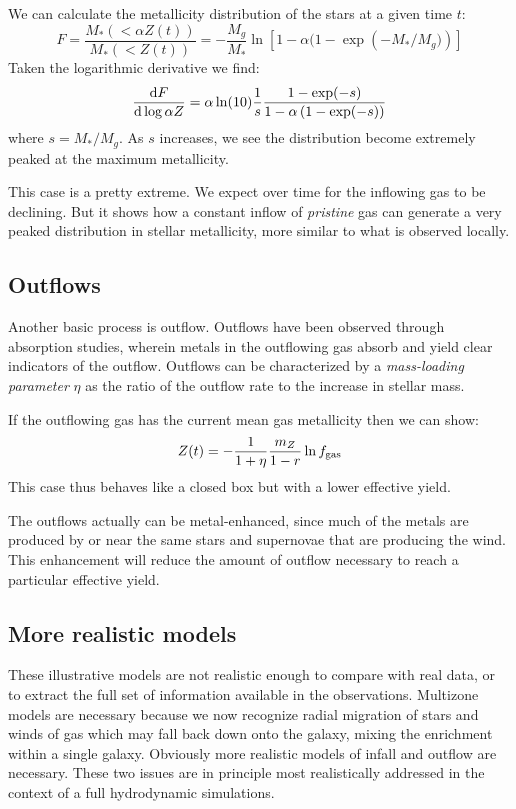 We can calculate the metallicity distribution of the stars at a given
time $t$:
\begin{equation}
  F=  \frac{M_\ast(<\alpha Z(t))}{M_\ast(<Z(t))}
  = -\frac{M_g}{M_\ast} \ln\left[1- \alpha (1- \exp\left(-M_\ast /
    M_g)\right) \right]
\end{equation}
Taken the logarithmic derivative we find:
\begin{equation}
  \frac{{\rm d}F}{{\rm d} \log\alpha Z}
  = \alpha \ln(10) \frac{1}{s} \frac{1-\exp(-s)}{1-
      \alpha\left(1-\exp(-s)\right) }
\end{equation}
where $s = M_\ast/M_g$. As $s$ increases, we see the distribution
become extremely peaked at the maximum metallicity.

This case is a pretty extreme. We expect over time for the inflowing
gas to be declining.  But it shows how a constant inflow of {\it
pristine} gas can generate a very peaked distribution in stellar
metallicity, more similar to what is observed locally.

\subsection{Outflows}

Another basic process is outflow. Outflows have been observed through
absorption studies, wherein metals in the outflowing gas absorb and
yield clear indicators of the outflow. Outflows can be characterized
by a {\it mass-loading parameter} $\eta$ as the ratio of the outflow
rate to the increase in stellar mass.

If the outflowing gas has the current mean gas metallicity then we can
show:
\begin{equation}
Z(t) = - \frac{1}{1+\eta} \frac{m_Z}{1-r} \ln f_{\rm gas}
\end{equation}
This case thus behaves like a closed box but with a lower effective
yield.

The outflows actually can be metal-enhanced, since much of the metals
are produced by or near the same stars and supernovae that are
producing the wind. This enhancement will reduce the amount of outflow
necessary to reach a particular effective yield.

\subsection{More realistic models}

These illustrative models are not realistic enough to compare with
real data, or to extract the full set of information available in the
observations. Multizone models are necessary because we now recognize
radial migration of stars and winds of gas which may fall back down
onto the galaxy, mixing the enrichment within a single
galaxy. Obviously more realistic models of infall and outflow are
necessary. These two issues are in principle most realistically
addressed in the context of a full hydrodynamic simulations.

